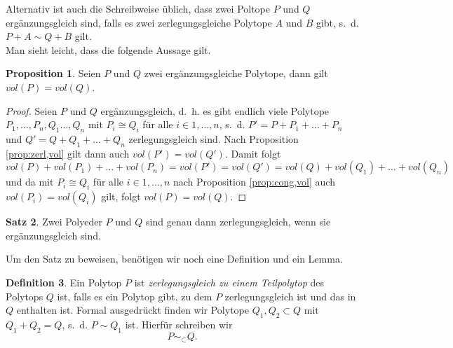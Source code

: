 \documentclass[11pt,titlepage]{article}
\theoremstyle{definition}
\newtheorem{theorem}{Satz}[section]
\newtheorem{proposition}[theorem]{Proposition}
\newtheorem{definition}[theorem]{Definition}
\theoremstyle{remark}
\begin{document}
	Alternativ ist auch die Schreibweise üblich, dass zwei Poltope $P$ und $Q$
	ergänzungsgleich sind, falls es zwei zerlegungsgleiche Polytope 
	$A$ und $B$ gibt, s.~d. $P+A\sim Q+B$ gilt. \\
	Man sieht leicht, dass die folgende Aussage gilt.
	
	\begin{proposition}\label{coroll:ergvol}
		Seien $P$ und $Q$ zwei ergänzungsgleiche Polytope, dann gilt $vol(P)=vol(Q)$.
	\end{proposition}
	
	\begin{proof}
		Seien $P$ und $Q$ ergänzungsgleich, d.~h. es gibt endlich viele Polytope $P_1,\ldots,P_n,
		Q_1\ldots,Q_n$ mit $P_i\cong Q_i$ für alle $i\in{1,\ldots,n}$, s.~d. 
		$P'=P+P_1+\ldots+P_n$ und $Q'=Q+Q_1+\ldots+Q_n$ zerlegungsgleich sind. Nach 
		Proposition \ref{prop:zerl,vol} gilt dann auch $vol(P')=vol(Q')$. Damit folgt
		\[vol(P)+vol(P_1)+\ldots+vol(P_n)=vol(P')=vol(Q')=vol(Q)+vol(Q_1)+\ldots+vol(Q_n)\]
		und da mit $P_i\cong Q_i$ für alle $i\in{1,\ldots,n}$ nach Proposition \ref{prop:cong,vol} 
		auch $vol(P_i)=vol(Q_i)$ gilt, folgt $vol(P)=vol(Q)$.
	\end{proof}
	
	\begin{theorem} \label{thm:zerlerg}
		Zwei Polyeder $P$ und $Q$ sind genau dann zerlegungsgleich, wenn 
		sie ergänzungsgleich sind.
	\end{theorem}
	
	Um den Satz zu beweisen, benötigen wir noch eine Definition und ein Lemma.
	
	\begin{definition}
		Ein Polytop $P$ ist \textsl{zerlegungsgleich zu einem Teilpolytop} 
		des Polytops $Q$ ist, falls es ein Polytop gibt, zu dem 
		$P$ zerlegungsgleich ist und das in $Q$ enthalten ist. Formal 
		ausgedrückt finden wir Polytope $Q_1,Q_2\subset Q$ mit 
		$Q_1+Q_2=Q$, s.~d. $P\sim Q_1$ ist. Hierfür schreiben wir 
		\[P\sim_{\subset} Q.\]
	\end{definition}
	
\end{document}
